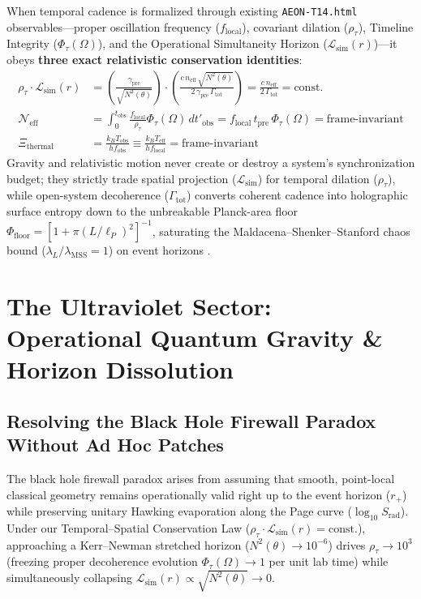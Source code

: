 \documentclass[11pt,a4paper]{article}
\begin{document}
When temporal cadence is formalized through existing \texttt{AEON-T14.html} observables---proper oscillation frequency ($f_{\mathrm{local}}$), covariant dilation ($\rho_\tau$), Timeline Integrity ($\Phi_\tau(\Omega)$), and the Operational Simultaneity Horizon ($\mathcal{L}_{\mathrm{sim}}(r)$)---it obeys \textbf{three exact relativistic conservation identities}:
\begin{align}
    \rho_\tau \cdot \mathcal{L}_{\mathrm{sim}}(r) &= \left(\frac{\gamma_{\mathrm{pre}}}{\sqrt{N^2(\theta)}}\right) \cdot \left(\frac{c \, n_{\mathrm{eff}} \, \sqrt{N^2(\theta)}}{2 \, \gamma_{\mathrm{pre}} \, \Gamma_{\mathrm{tot}}}\right) = \frac{c \, n_{\mathrm{eff}}}{2 \, \Gamma_{\mathrm{tot}}} = \mathrm{const.} \\
    \mathcal{N}_{\mathrm{eff}} &= \int_0^{t_{\mathrm{obs}}} \frac{f_{\mathrm{local}}}{\rho_\tau} \Phi_\tau(\Omega) \, dt'_{\mathrm{obs}} = f_{\mathrm{local}} \, t_{\mathrm{pre}} \, \Phi_\tau(\Omega) = \text{frame-invariant} \\
    \Xi_{\mathrm{thermal}} &= \frac{k_B T_{\mathrm{obs}}}{h f_{\mathrm{obs}}} \equiv \frac{k_B T_{\mathrm{eff}}}{h f_{\mathrm{local}}} = \text{frame-invariant}
\end{align}
Gravity and relativistic motion never create or destroy a system's synchronization budget; they strictly trade spatial projection ($\mathcal{L}_{\mathrm{sim}}$) for temporal dilation ($\rho_\tau$), while open-system decoherence ($\Gamma_{\mathrm{tot}}$) converts coherent cadence into holographic surface entropy down to the unbreakable Planck-area floor $\Phi_{\mathrm{floor}} = [1 + \pi(L/\ell_P)^2]^{-1}$, saturating the Maldacena--Shenker--Stanford chaos bound ($\lambda_L / \lambda_{\mathrm{MSS}} = 1$) on event horizons \cite{mss2016}.

\section{The Ultraviolet Sector: Operational Quantum Gravity \& Horizon Dissolution}

\subsection{Resolving the Black Hole Firewall Paradox Without Ad Hoc Patches}
The black hole firewall paradox arises from assuming that smooth, point-local classical geometry remains operationally valid right up to the event horizon ($r_+$) while preserving unitary Hawking evaporation along the Page curve ($\log_{10} S_{\mathrm{rad}}$). Under our Temporal--Spatial Conservation Law ($\rho_\tau \cdot \mathcal{L}_{\mathrm{sim}}(r) = \mathrm{const.}$), approaching a Kerr--Newman stretched horizon ($N^2(\theta) \to 10^{-6}$) drives $\rho_\tau \to 10^3$ (freezing proper decoherence evolution $\Phi_\tau(\Omega) \to 1$ per unit lab time) while simultaneously collapsing $\mathcal{L}_{\mathrm{sim}}(r) \propto \sqrt{N^2(\theta)} \to 0$.
\end{document}
